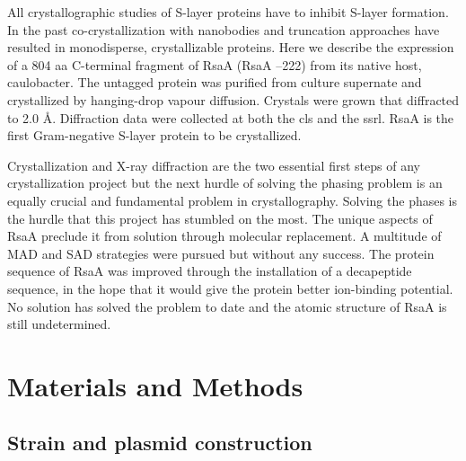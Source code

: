 All crystallographic studies of \ac{S-layer} proteins have to inhibit \ac{S-layer} formation. In the
past co-crystallization with nanobodies
 and truncation
 approaches have resulted in monodisperse, crystallizable proteins. Here we describe the
expression of a 804 \ac{aa} C-terminal fragment of RsaA (RsaA --222) from
its native host, \ac{caulobacter}. The untagged protein was purified
from culture supernate and crystallized by hanging-drop vapour
diffusion. Crystals were grown that diffracted to 2.0 \AA.
Diffraction data were collected at both the \ac{cls} 
and the \ac{ssrl}. RsaA is the first Gram-negative \ac{S-layer} protein to be crystallized.

Crystallization and X-ray diffraction are the two essential first steps of any crystallization project but the next hurdle of solving the phasing problem is an equally crucial and fundamental problem in crystallography. Solving the phases is the hurdle that this project has stumbled on the most. The unique aspects of RsaA preclude it from solution through molecular replacement. A multitude of \ac{MAD} and \ac{SAD} strategies were pursued but without any success. The protein sequence of RsaA was improved through the installation of a decapeptide sequence, in the hope that it would give the protein better ion-binding potential. No solution has solved the problem to date and the atomic structure of RsaA is still undetermined.

\section{Materials and Methods}
\label{sec:crystal-materials-and-methods}

\subsection{Strain and plasmid construction}\label{sec:stra-plasm-constr}

